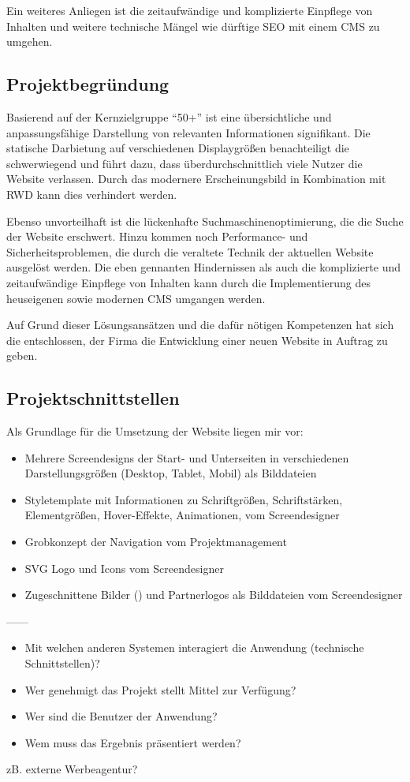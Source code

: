 Ein weiteres Anliegen ist die zeitaufwändige und komplizierte Einpflege von
Inhalten und weitere technische Mängel wie \zB dürftige \ac{SEO} mit einem
\ac{CMS} zu umgehen.


\subsection{Projektbegründung} 
\label{sec:Projektbegruendung}
Basierend auf der Kernzielgruppe "`50+"' ist eine übersichtliche und
anpassungsfähige Darstellung von relevanten Informationen signifikant. 
Die statische Darbietung auf verschiedenen Displaygrößen benachteiligt die
 schwerwiegend und führt dazu, dass
überdurchschnittlich viele Nutzer die Website verlassen. Durch das modernere
Erscheinungsbild in Kombination mit \ac{RWD} kann dies verhindert werden.
 
Ebenso unvorteilhaft ist die lückenhafte Suchmaschinenoptimierung, die die Suche
der Website erschwert. Hinzu kommen noch Performance- und
Sicherheitsproblemen, die durch die veraltete Technik der aktuellen Website
ausgelöst werden. Die eben gennanten Hindernissen als auch die komplizierte und
zeitaufwändige Einpflege von Inhalten kann durch die Implementierung des heuseigenen
sowie modernen \ac{CMS} \ct umgangen werden.

Auf Grund dieser Lösungsansätzen und die dafür nötigen Kompetenzen hat sich die
\kunde entschlossen, der Firma \mh die Entwicklung einer neuen Website in
Auftrag zu geben.

\subsection{Projektschnittstellen} 
\label{sec:Projektschnittstellen}



Als Grundlage für die Umsetzung der Website liegen mir vor:
\begin{itemize}
	\item Mehrere Screendesigns der Start- und Unterseiten in verschiedenen
Darstellungsgrößen (Desktop, Tablet, Mobil) als Bilddateien
	\item Styletemplate mit Informationen zu Schriftgrößen, Schriftstärken,
Elementgrößen, Hover-Effekte, Animationen, \usw vom Screendesigner
	\item Grobkonzept der Navigation vom Projektmanagement
	\item SVG Logo und Icons vom Screendesigner
	\item Zugeschnittene Bilder () und Partnerlogos als
	Bilddateien vom Screendesigner
\end{itemize}

------

\begin{itemize}
	\item Mit welchen anderen Systemen interagiert die Anwendung (technische Schnittstellen)?
	\item Wer genehmigt das Projekt \bzw stellt Mittel zur Verfügung? 
	\item Wer sind die Benutzer der Anwendung?
	\item Wem muss das Ergebnis präsentiert werden?
\end{itemize}
zB. externe Werbeagentur?
